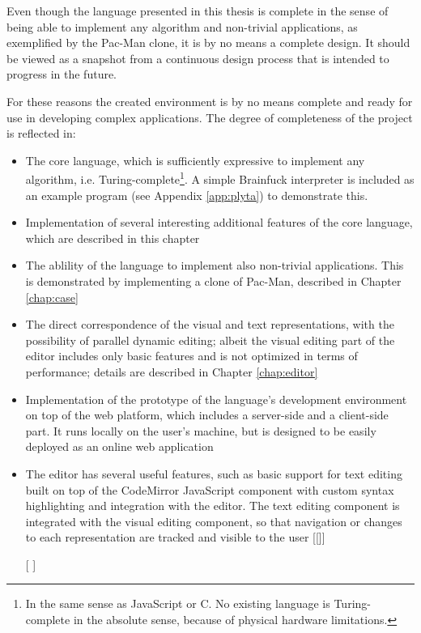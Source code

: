 Even though the language presented in this thesis is complete in the sense of
being able to implement any algorithm and non-trivial applications, as
exemplified by the Pac-Man clone, it is by no means a complete design. It should
be viewed as a snapshot from a continuous design process that is intended to
progress in the future.

For these reasons the created environment is by no means complete and ready for
use in developing complex applications. The degree of completeness of the
project is reflected in:
\begin{itemize}
    \item The core language, which is sufficiently expressive to implement any
    algorithm, i.e. Turing-complete\footnote{In the same sense as JavaScript or C. No existing language is Turing-complete in the absolute sense, because of physical hardware limitations.}. A simple Brainfuck interpreter is included as an example program (see Appendix \ref{app:plyta}) to demonstrate this\cite{bf_turing_complete}.   
    \item Implementation of several interesting additional features of the core
    language, which are described in this chapter 
    \item The ablility of the language to implement also non-trivial
    applications. This is demonstrated by implementing a clone of Pac-Man,
    described in Chapter \ref{chap:case}
    \item The direct correspondence of the visual and text representations, with
    the possibility of parallel dynamic editing; albeit the visual editing
    part of the editor includes only basic features and is not optimized in
    terms of performance; details are described in Chapter \ref{chap:editor}
    \item Implementation of the prototype of the language's development
    environment on top of the web platform, which includes a server-side and a
    client-side part. It runs locally on the user's machine, but is designed
    to be easily deployed as an online web application
    \item The editor has several useful features, such as basic support for text
    editing built on top of the CodeMirror JavaScript component with custom
    syntax highlighting and integration with the editor. The text editing
    component is integrated with the visual editing component, so that
    navigation or changes to each representation are tracked and visible to
    the user [[]]
    \item [[]]
\end{itemize}


